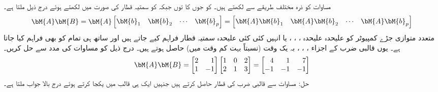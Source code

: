 مساوات  کو ذرہ مختلف طریقے سے لکھتے ہیں۔ کو جوں کا توں جبکہ  کو سمتیہ قطار کی صورت میں  لکھتے ہوئے درج ذیل ملتا ہے۔
\begin{align}\label{مساوات_الجبرا_ضرب_بذریعہ_کمپیوٹر}
\bM{A}\bM{B}=\bM{A}
\begin{bmatrix}
\bM{b}_1 & \bM{b}_2 & \cdots & \bM{b}_p
\end{bmatrix}=
\begin{bmatrix}
\bM{A}\bM{b}_1 &\bM{A} \bM{b}_2 & \cdots & \bM{A}\bM{b}_p
\end{bmatrix}
\end{align}
متعدد متوازی جڑے کمپیوٹر کو علیحدہ علیحدہ ، ، ،   یا انہیں کئی کئی علیحدہ سمتیہ قطار فراہم کیے جاتے ہیں اور ساتھ ہی تمام کو  بھی فراہم کیا جاتا ہے۔ یوں قالبی ضرب کے اجزاء ، ، ،  بہ یک وقت (نسبتاً بہت کم وقت میں) حاصل ہوتے ہیں۔
درج ذیل کو مساوات  کی مدد سے حل کریں۔
\begin{align*}
\bM{A}\bM{B}=
\begin{bmatrix*}[r]
2&1\\
1&-1
\end{bmatrix*}
\begin{bmatrix*}[r]
1&0&2\\
2&1&3
\end{bmatrix*}=
\begin{bmatrix*}[r]
4&1&7\\
-1&-1&-1
\end{bmatrix*}
\end{align*}
حل: مساوات  سے قالبی ضرب کی  قطار حاصل کرتے ہیں جنہیں ایک ہی قالب میں یکجا کرتے ہوئے درج بالا جواب ملتا ہے۔
